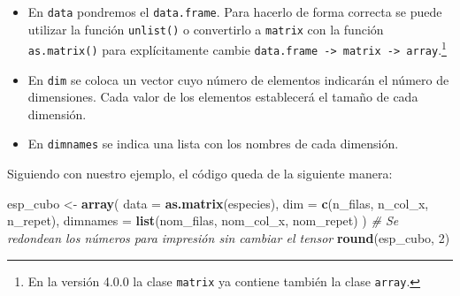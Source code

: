 \documentclass[
  spanish,
]{article}
\newenvironment{Shaded}{\begin{snugshade}}{\end{snugshade}}
\newcommand{\CommentTok}[1]{\textcolor[rgb]{0.56,0.35,0.01}{\textit{#1}}}
\newcommand{\DataTypeTok}[1]{\textcolor[rgb]{0.13,0.29,0.53}{#1}}
\newcommand{\DecValTok}[1]{\textcolor[rgb]{0.00,0.00,0.81}{#1}}
\newcommand{\KeywordTok}[1]{\textcolor[rgb]{0.13,0.29,0.53}{\textbf{#1}}}
\newcommand{\NormalTok}[1]{#1}
\newcommand{\StringTok}[1]{\textcolor[rgb]{0.31,0.60,0.02}{#1}}
\providecommand{\tightlist}{%
  \setlength{\itemsep}{0pt}\setlength{\parskip}{0pt}}
\begin{document}
\begin{itemize}
\tightlist
\item
  En \texttt{data} pondremos el \texttt{data.frame}. Para hacerlo de forma correcta se puede utilizar la función \texttt{unlist()} o convertirlo a \texttt{matrix} con la función \texttt{as.matrix()} para explícitamente cambie \texttt{data.frame\ -\textgreater{}\ matrix\ -\textgreater{}\ array}.\footnote{En la versión 4.0.0 la clase \texttt{matrix} ya contiene también la clase \texttt{array}.}
\item
  En \texttt{dim} se coloca un vector cuyo número de elementos indicarán el número de dimensiones. Cada valor de los elementos establecerá el tamaño de cada dimensión.
\item
  En \texttt{dimnames} se indica una lista con los nombres de cada dimensión.
\end{itemize}

Siguiendo con nuestro ejemplo, el código queda de la siguiente manera:

\begin{Shaded}
\begin{Highlighting}[]
\NormalTok{esp\_cubo \textless{}{-}}\StringTok{ }\KeywordTok{array}\NormalTok{(}
  \DataTypeTok{data =} \KeywordTok{as.matrix}\NormalTok{(especies),}
  \DataTypeTok{dim =} \KeywordTok{c}\NormalTok{(n\_filas, n\_col\_x, n\_repet),}
  \DataTypeTok{dimnames =} \KeywordTok{list}\NormalTok{(nom\_filas, nom\_col\_x, nom\_repet)}
\NormalTok{)}
\CommentTok{\# Se redondean los números para impresión sin cambiar el tensor}
\KeywordTok{round}\NormalTok{(esp\_cubo, }\DecValTok{2}\NormalTok{) }
\end{Highlighting}
\end{Shaded}
\end{document}
